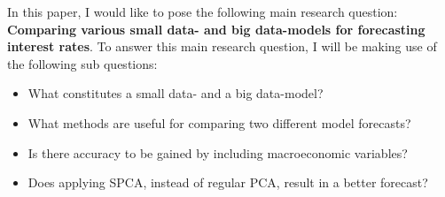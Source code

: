 In this paper, I would like to pose the following main research question:
\textbf{Comparing various small data- and big data-models for forecasting interest rates}. To answer this main research question, I will be making use of the following sub questions:
\begin{itemize}
	\item What constitutes a small data- and a big data-model?
	\item What methods are useful for comparing two different model forecasts?
	\item Is there accuracy to be gained by including macroeconomic variables?
	\item Does applying SPCA, instead of regular PCA, result in a better forecast?
\end{itemize}